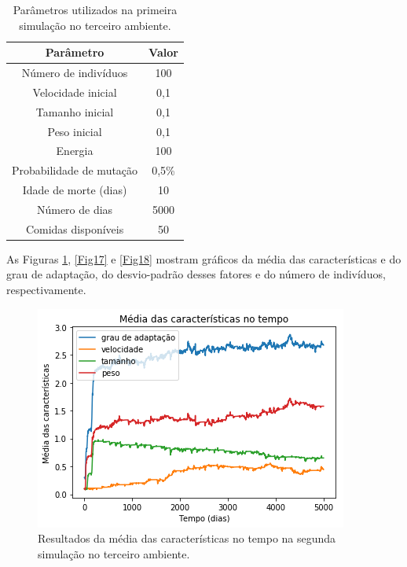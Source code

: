 \documentclass[10pt,brazil,english]{article}
\begin{document}
            \begin{table}[!hbtp]
                \centering
                \caption{Parâmetros utilizados na primeira simulação no terceiro ambiente.}
                \label{Tab6}
                \begin{tabular}{c|c}
                    \hline
                    \textbf{Parâmetro}          & \textbf{Valor}    \\ \hline
                    Número de indivíduos        & 100               \\ \hline
                    Velocidade inicial          & 0,1               \\ \hline
                    Tamanho inicial             & 0,1               \\ \hline
                    Peso inicial                & 0,1               \\ \hline
                    Energia                     & 100               \\ \hline
                    Probabilidade de mutação    & 0,5\%             \\ \hline
                    Idade de morte (dias)       & 10                \\ \hline
                    Número de dias              & 5000              \\ \hline
                    Comidas disponíveis         & 50                \\ \hline
                \end{tabular}
            \end{table}
            
            As Figuras \ref{Fig16}, \ref{Fig17} e \ref{Fig18} mostram gráficos da média das características e do grau de adaptação, do desvio-padrão desses fatores e do número de indivíduos, respectivamente.
            
            \begin{figure}[!hbtp]
                \begin{center}
                    \includegraphics[scale=0.5]{Images/3-4.png}
                \end{center}
                \caption{Resultados da média das características no tempo na segunda simulação no terceiro ambiente.}
                \label{Fig16}
            \end{figure} 
            
\end{document}
